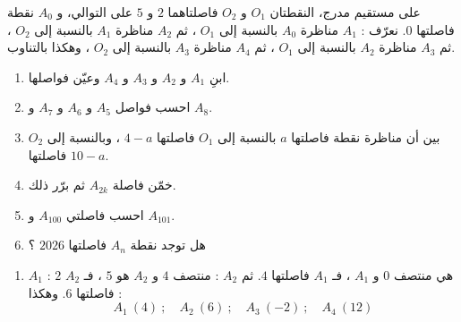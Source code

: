 \documentclass[12pt,a4paper]{article}
\begin{document}
\begin{corr}[title={تركيب : تناظرات متتالية}, stars=4, source={Axiomaths}]
على مستقيم مدرج، النقطتان $O_1$ و $O_2$ فاصلتاهما $2$ و $5$ على التوالي، و $A_0$ نقطة فاصلتها $0$.
نعرّف : $A_1$ مناظرة $A_0$ بالنسبة إلى $O_1$ ، ثم $A_2$ مناظرة $A_1$ بالنسبة إلى $O_2$ ، ثم $A_3$ مناظرة $A_2$ بالنسبة إلى $O_1$ ، ثم $A_4$ مناظرة $A_3$ بالنسبة إلى $O_2$ ، وهكذا بالتناوب.
\begin{center}
\end{center}
\begin{enumerate}
  \item ابنِ $A_1$ و $A_2$ و $A_3$ و $A_4$ وعيّن فواصلها.
  \item احسب فواصل $A_5$ و $A_6$ و $A_7$ و $A_8$.
  \item بين أن مناظرة نقطة فاصلتها $a$ بالنسبة إلى $O_1$ فاصلتها $4-a$ ، وبالنسبة إلى $O_2$ فاصلتها $10-a$.
  \item خمّن فاصلة $A_{2k}$ ثم برّر ذلك.
  \item احسب فاصلتي $A_{100}$ و $A_{101}$.
  \item هل توجد نقطة $A_n$ فاصلتها $2026$ ؟
\end{enumerate}
\axsol
\begin{enumerate}[itemsep=14pt]
  \item $A_1$ : $2$ هي منتصف $0$ و $A_1$ ، فـ $A_1$ فاصلتها $4$. ثم $A_2$ : منتصف $4$ و $A_2$ هو $5$ ، فـ $A_2$ فاصلتها $6$. وهكذا :
  \[A_1\ (4)\ ;\quad A_2\ (6)\ ;\quad A_3\ (-2)\ ;\quad A_4\ (12)\]
  \begin{center}
\end{center}
\end{enumerate}
\end{corr}
\end{document}
